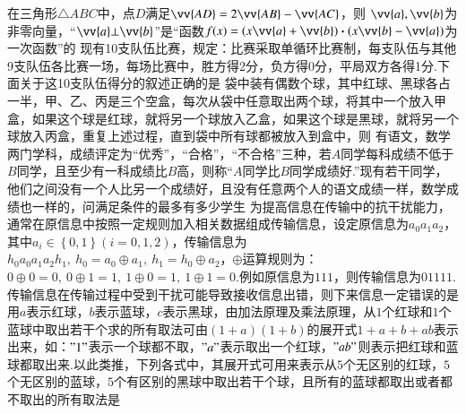 \documentclass{BHCexam}
\begin{document}
\begin{questions}
\qs 在三角形$\triangle ABC$中，点$ D $满足$ \vv{AD}=2\vv{AB}-\vv{AC} $，则\xx
{}
\qs $\vv{a},\vv{b} $为非零向量，“$ \vv{a}\bot\vv{b} $”是“函数$ f(x)=(x\vv{a}+\vv{b})\bm\cdot(x\vv{b}-\vv{a}) $为一次函数”的\xx
{}
\qs 现有10支队伍比赛，规定：比赛采取单循环比赛制，每支队伍与其他9支队伍各比赛一场，每场比赛中，胜方得2分，负方得0分，平局双方各得1分.下面关于这10支队伍得分的叙述正确的是\xx
{} 
\qs 袋中装有偶数个球，其中红球、黑球各占一半，甲、乙、丙是三个空盒，每次从袋中任意取出两个球，将其中一个放入甲盒，如果这个球是红球，就将另一个球放入乙盒，如果这个球是黑球，就将另一个球放入丙盒，重复上述过程，直到袋中所有球都被放入到盒中，则\xx
{}
\qs 有语文，数学两门学科，成绩评定为“优秀”，“合格”，“不合格”三种，若$A$同学每科成绩不低于$B$同学，且至少有一科成绩比$B$高，则称“$A$同学比$ B $同学成绩好.”现有若干同学，他们之间没有一个人比另一个成绩好，且没有任意两个人的语文成绩一样，数学成绩也一样的，问满足条件的最多有多少学生\xx
{}
\qs 为提高信息在传输中的抗干扰能力，通常在原信息中按照一定规则加入相关数据组成传输信息，设定原信息为$ a_0a_1a_2 $，其中$ a_i\in\left\{0,1\right\}(i=0,1,2) $，传输信息为$ h_0a_0a_1a_2h_1,~h_0=a_0\oplus a_1,~h_1=h_0\oplus a_2 $，$ \oplus $运算规则为：$ 0\oplus 0=0,~0\oplus 1=1,~1\oplus 0=1,~1\oplus 1=0. $例如原信息为$ 111 $，则传输信息为$ 01111.~ $传输信息在传输过程中受到干扰可能导致接收信息出错，则下来信息一定错误的是\xx
{}
\qs 用$a$表示红球，$ b $表示蓝球，$ c $表示黑球，由加法原理及乘法原理，从$ 1 $个红球和$ 1 $个蓝球中取出若干个求的所有取法可由$ \left(1+a\right)\left(1+b\right) $的展开式$ 1+a+b+ab $表示出来，如：$ "1" $表示一个球都不取，$ "a" $表示取出一个红球，$ "ab" $则表示把红球和蓝球都取出来.以此类推，下列各式中，其展开式可用来表示从$ 5 $个无区别的红球，$ 5 $个无区别的蓝球，$ 5 $个有区别的黑球中取出若干个球，且所有的蓝球都取出或者都不取出的所有取法是\xx
{}
\end{questions}
\end{document}
